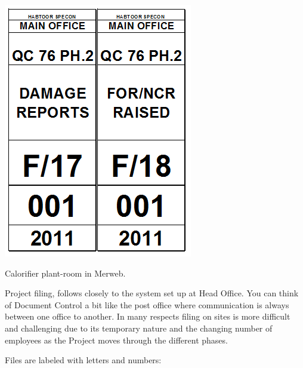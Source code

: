 \begin{marginfigure}
  \includegraphics[width=\linewidth]{labels}
  \caption{Calorifier plant-room in Merweb.}
  \label{fig:marginfig1}
\end{marginfigure}

Project filing, follows closely to the system set up at Head Office. You can think of Document Control a bit like the post office where communication is always between one office to another. In many respects filing on sites is more difficult and challenging due to its temporary nature and the changing number of employees as the Project moves through the different phases.

Files are labeled with letters and numbers:

\begin{center}
\end{center}
        
